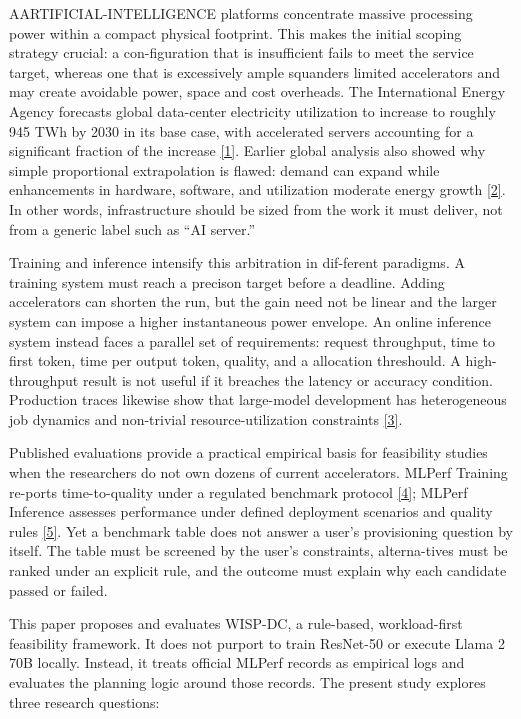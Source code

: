 \documentclass[final,3p,12pt,nopreprintline]{elsarticle}
\begin{document}
AARTIFICIAL-INTELLIGENCE platforms concentrate massive processing power within a compact physical footprint. This makes the initial scoping strategy crucial: a con-figuration that is insufficient fails to meet the service target, whereas one that is excessively ample squanders limited accelerators and may create avoidable power, space and cost overheads. The International Energy Agency forecasts global data-center electricity utilization to increase to roughly 945 TWh by 2030 in its base case, with accelerated servers accounting for a significant fraction of the increase \hyperref[ref:1]{[1]}. Earlier global analysis also showed why simple proportional extrapolation is flawed: demand can expand while enhancements in hardware, software, and utilization moderate energy growth \hyperref[ref:2]{[2]}. In other words, infrastructure should be sized from the work it must deliver, not from a generic label such as “AI server.”


Training and inference intensify this arbitration in dif-ferent paradigms. A training system must reach a precison target before a deadline. Adding accelerators can shorten the run, but the gain need not be linear and the larger system can impose a higher instantaneous power envelope. An online inference system instead faces a parallel set of requirements: request throughput, time to first token, time per output token, quality, and a allocation threshould. A high-throughput result is not useful if it breaches the latency or accuracy condition. Production traces likewise show that large-model development has heterogeneous job dynamics and non-trivial resource-utilization constraints \hyperref[ref:3]{[3]}.


Published evaluations provide a practical empirical basis for feasibility studies when the researchers do not own dozens of current accelerators. MLPerf Training re-ports time-to-quality under a regulated benchmark protocol \hyperref[ref:4]{[4]}; MLPerf Inference assesses performance under defined deployment scenarios and quality rules \hyperref[ref:5]{[5]}. Yet a benchmark table does not answer a user’s provisioning question by itself. The table must be screened by the user’s constraints, alterna-tives must be ranked under an explicit rule, and the outcome must explain why each candidate passed or failed.


This paper proposes and evaluates WISP-DC, a rule-based, workload-first feasibility framework. It does not purport to train ResNet-50 or execute Llama 2 70B locally. Instead, it treats official MLPerf records as empirical logs and evaluates the planning logic around those records. The present study explores three research questions:
\end{document}
